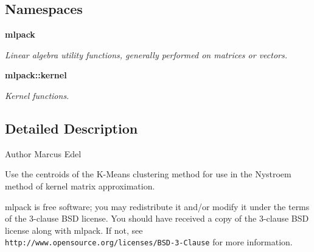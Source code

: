 \subsection*{Namespaces}
\begin{DoxyCompactItemize}
\item 
 \textbf{ mlpack}
\begin{DoxyCompactList}\small\item\em Linear algebra utility functions, generally performed on matrices or vectors. \end{DoxyCompactList}\item 
 \textbf{ mlpack\+::kernel}
\begin{DoxyCompactList}\small\item\em Kernel functions. \end{DoxyCompactList}\end{DoxyCompactItemize}


\subsection{Detailed Description}
\begin{DoxyAuthor}{Author}
Marcus Edel
\end{DoxyAuthor}
Use the centroids of the K-\/\+Means clustering method for use in the Nystroem method of kernel matrix approximation.

mlpack is free software; you may redistribute it and/or modify it under the terms of the 3-\/clause B\+SD license. You should have received a copy of the 3-\/clause B\+SD license along with mlpack. If not, see {\tt http\+://www.\+opensource.\+org/licenses/\+B\+S\+D-\/3-\/\+Clause} for more information. 